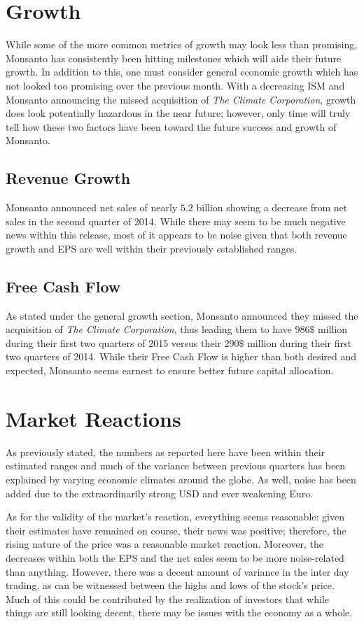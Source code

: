 \documentclass[12pt,letterpaper,english]{article}
\newcommand{\newpar}{\vspace{10mm}\noindent}
\begin{document}
\section{Growth}
While some of the more common metrics of growth may look less than promising, Monsanto has consistently been hitting milestones which will aide their future growth. In addition to this, one must consider general economic growth which has not looked too promising over the previous month. With a decreasing ISM and Monsanto announcing the missed acquisition of \textit{The Climate Corporation}, growth does look potentially hazardous in the near future; however, only time will truly tell how these two factors have been toward the future success and growth of Monsanto.

\subsection{Revenue Growth}
Monsanto announced net sales of nearly $5.2$ billion showing a decrease from net sales in the second quarter of 2014. While there may seem to be much negative news within this release, most of it appears to be noise given that both revenue growth and EPS are well within their previously established ranges. 

\subsection{Free Cash Flow}
As stated under the general growth section, Monsanto announced they missed the acquisition of \textit{The Climate Corporation}, thus leading them to have $986 \$$ million during their first two quarters of 2015 versus their $290 \$$ million during their first two quarters of 2014. While their Free Cash Flow is higher than both desired and expected, Monsanto seems earnest to ensure better future capital allocation. 

\section{Market Reactions}
As previously stated, the numbers as reported here have been within their estimated ranges and much of the variance between previous quarters has been explained by varying economic climates around the globe. As well, noise has been added due to the extraordinarily strong USD and ever weakening Euro.

\newpar
As for the validity of the market's reaction, everything seems reasonable: given their estimates have remained on course, their news was positive; therefore, the rising nature of the price was a reasonable market reaction. Moreover, the decreases within both the EPS and the net sales seem to be more noise-related than anything. However, there was a decent amount of variance in the inter day trading, as can be witnessed between the highs and lows of the stock's price. Much of this could be contributed by the realization of investors that while things are still looking decent, there may be issues with the economy as a whole.
\end{document}
